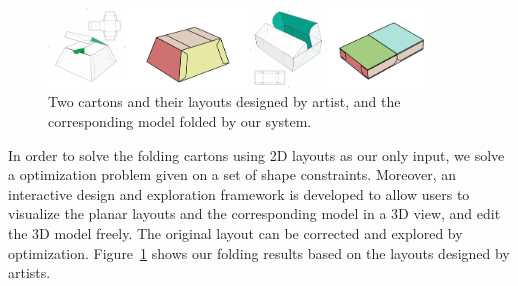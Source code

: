 \begin{figure}
	\centering
	\includegraphics[width=0.9\textwidth]{images/artist}
	\caption{Two cartons and their layouts designed by artist, and the corresponding model folded by our system.}
	\label{fig:artist}
\end{figure}




%
 
 
In order to solve the folding cartons using 2D layouts as our only input, we solve a optimization problem given on a set of shape constraints.
Moreover, an interactive design and exploration framework is developed to allow users to visualize the planar layouts and the corresponding model in a 3D view, and edit the 3D model freely. The original layout can be corrected and explored by optimization. Figure~\ref{fig:artist} shows our folding results based on the layouts designed by artists. 

